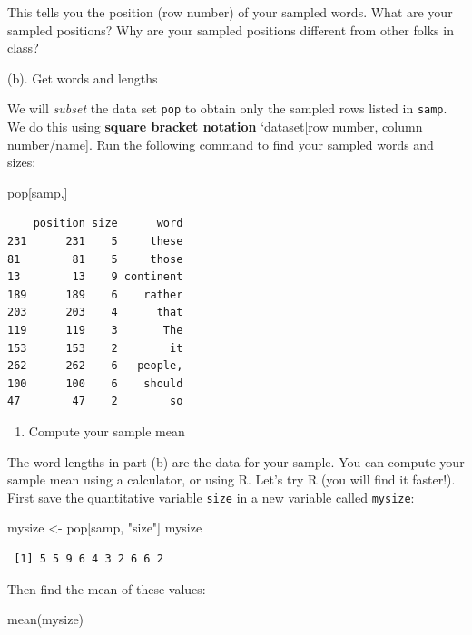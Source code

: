 \documentclass[
]{book}
\newenvironment{Shaded}{\begin{snugshade}}{\end{snugshade}}
\newcommand{\FunctionTok}[1]{\textcolor[rgb]{0.00,0.00,0.00}{#1}}
\newcommand{\NormalTok}[1]{#1}
\newcommand{\OtherTok}[1]{\textcolor[rgb]{0.56,0.35,0.01}{#1}}
\newcommand{\StringTok}[1]{\textcolor[rgb]{0.31,0.60,0.02}{#1}}
\providecommand{\tightlist}{%
  \setlength{\itemsep}{0pt}\setlength{\parskip}{0pt}}
\begin{document}
This tells you the position (row number) of your sampled words. What are your sampled positions? Why are your sampled positions different from other folks in class?

(b). Get words and lengths

We will \emph{subset} the data set \texttt{pop} to obtain only the sampled rows listed in \texttt{samp}. We do this using \textbf{square bracket notation} `dataset{[}row number, column number/name{]}. Run the following command to find your sampled words and sizes:

\begin{Shaded}
\begin{Highlighting}[]
\NormalTok{pop[samp,]}
\end{Highlighting}
\end{Shaded}

\begin{verbatim}
    position size      word
231      231    5     these
81        81    5     those
13        13    9 continent
189      189    6    rather
203      203    4      that
119      119    3       The
153      153    2        it
262      262    6   people,
100      100    6    should
47        47    2        so
\end{verbatim}

\begin{enumerate}
\def\labelenumi{\alph{enumi}.}
\setcounter{enumi}{2}
\tightlist
\item
  Compute your sample mean
\end{enumerate}

The word lengths in part (b) are the data for your sample. You can compute your sample mean using a calculator, or using R. Let's try R (you will find it faster!). First save the quantitative variable \texttt{size} in a new variable called \texttt{mysize}:

\begin{Shaded}
\begin{Highlighting}[]
\NormalTok{mysize }\OtherTok{\textless{}{-}}\NormalTok{ pop[samp, }\StringTok{"size"}\NormalTok{]}
\NormalTok{mysize}
\end{Highlighting}
\end{Shaded}

\begin{verbatim}
 [1] 5 5 9 6 4 3 2 6 6 2
\end{verbatim}

Then find the mean of these values:

\begin{Shaded}
\begin{Highlighting}[]
\FunctionTok{mean}\NormalTok{(mysize)}
\end{Highlighting}
\end{Shaded}
\end{document}
